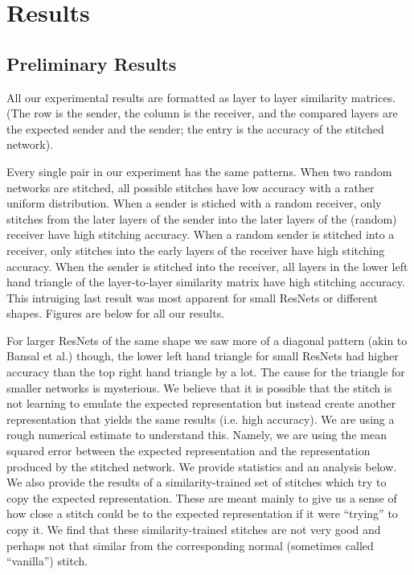 \documentclass{article} %
\begin{document}
\section{Results}
\label{Results}
\subsection*{Preliminary Results}
All our experimental results are formatted as layer to
layer similarity matrices. (The row is the sender, the column is the receiver, and the compared layers are the expected sender
and the sender; the entry is the accuracy of the stitched network).

Every single pair in our experiment has the same
patterns. When two random networks are stitched, all possible stitches have low accuracy with a rather uniform distribution. When
a sender is stiched with a random receiver, only stitches from the later layers of the sender into the later layers of the (random)
receiver have high stitching accuracy. When a random sender is stitched into a receiver, only stitches into the early layers of the
receiver have high stitching accuracy. When the sender is stitched into the receiver, all layers in the lower left hand triangle
of the layer-to-layer similarity matrix have high stitching accuracy. 
This intruiging last result was most apparent for small ResNets or different shapes.
Figures are below for all our results.

For larger ResNets of the same shape we saw more of a diagonal pattern (akin to Bansal et al.) though, the lower left hand triangle for small
ResNets had higher
accuracy than the top right hand triangle by a lot. 
The cause for the triangle for smaller networks is mysterious. We believe that
it is possible that the stitch is not learning to emulate the expected representation but instead create another representation
that yields the same results (i.e. high accuracy). We are using a rough numerical estimate to understand this. Namely, we
are using the mean squared error between the expected representation and the representation produced by the stitched network.
We provide statistics and an analysis below. We also provide the results of a similarity-trained set of stitches which
try to copy the expected representation. These are meant mainly to give us a sense of how close a stitch could be to the
expected representation if it were ``trying'' to copy it. We find that these similarity-trained stitches are not very good
and perhaps not that similar from the corresponding normal (sometimes called ``vanilla'') stitch.
\end{document}

